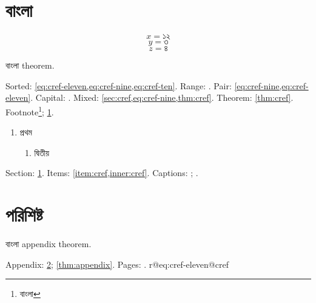 \section{বাংলা}\label{sec:cref}
\setcounter{equation}{8}
\begin{equation}x=১২\label{eq:cref-nine}\end{equation}
\begin{equation}y=৩\label{eq:cref-ten}\end{equation}
\begin{equation}z=৪\label{eq:cref-eleven}\end{equation}
\begin{result}\label{thm:cref}বাংলা theorem.\end{result}
Sorted: \cref{eq:cref-eleven,eq:cref-nine,eq:cref-ten}.
Range: .
Pair: \cref{eq:cref-nine,eq:cref-eleven}.
Capital: .
Mixed: \cref{sec:cref,eq:cref-nine,thm:cref}.
Theorem: \cref{thm:cref}.
Footnote\footnote{বাংলা\label{fn:cref}}; \cref{fn:cref}.
\begin{enumerate}
\item প্রথম\label{item:cref}
\begin{enumerate}\item দ্বিতীয়\label{inner:cref}\end{enumerate}
\end{enumerate}
Section: \cref{sec:cref}.
Items: \cref{item:cref,inner:cref}.
\label{fig:cref}
\label{tab:cref}
Captions: ; .
\newpage
\appendix
\section{পরিশিষ্ট}\label{app:cref}
\begin{result}\label{thm:appendix}বাংলা appendix theorem.\end{result}
Appendix: \cref{app:cref}; \cref{thm:appendix}.
Pages: .
\makeatletter
\ifcsname r@eq:cref-eleven@cref\endcsname
{}
\fi
\makeatother
\makeatletter
{}
\makeatother
